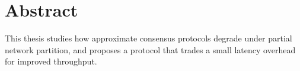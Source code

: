 \chapter{Abstract}

This thesis studies how approximate consensus protocols degrade under
partial network partition, and proposes a protocol that trades a small
latency overhead for improved throughput.
